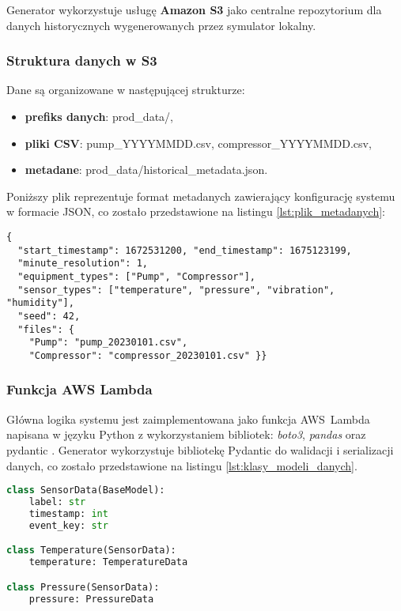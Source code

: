 Generator wykorzystuje usługę \textbf{Amazon S3} jako centralne repozytorium dla danych historycznych wygenerowanych przez symulator lokalny.

\subsubsection{Struktura danych w S3}

Dane są organizowane w następującej strukturze:

\begin{itemize}
    \item \textbf{prefiks danych}: prod\_data/,
    \item \textbf{pliki CSV}: pump\_YYYYMMDD.csv, compressor\_YYYYMMDD.csv,
    \item \textbf{metadane}: prod\_data/historical\_metadata.json.
\end{itemize}

\vspace{0.3em}

Poniższy plik reprezentuje format metadanych zawierający konfigurację systemu w formacie JSON, co zostało przedstawione na listingu \ref{lst:plik_metadanych}:

\begin{lstlisting}[caption=Przykładowy plik metadanych, label={lst:plik_metadanych}]
{
  "start_timestamp": 1672531200, "end_timestamp": 1675123199,
  "minute_resolution": 1,
  "equipment_types": ["Pump", "Compressor"],
  "sensor_types": ["temperature", "pressure", "vibration", "humidity"],
  "seed": 42,
  "files": {
    "Pump": "pump_20230101.csv",
    "Compressor": "compressor_20230101.csv" }}
\end{lstlisting}

\newpage

\subsubsection{Funkcja AWS Lambda}
\label{subsec:aws_lambda}

Główna logika systemu jest zaimplementowana jako funkcja \mbox{AWS Lambda} napisana w języku Python z wykorzystaniem bibliotek: \textit{boto3}, \textit{pandas} oraz pydantic \cite{pydantic_docs}. Generator wykorzystuje bibliotekę Pydantic do walidacji i serializacji danych, co zostało przedstawione na listingu \ref{lst:klasy_modeli_danych}.

\begin{lstlisting}[language=Python, caption=Klasy modeli danych, label={lst:klasy_modeli_danych}]
class SensorData(BaseModel):
    label: str
    timestamp: int
    event_key: str

class Temperature(SensorData):
    temperature: TemperatureData

class Pressure(SensorData):
    pressure: PressureData
\end{lstlisting}

